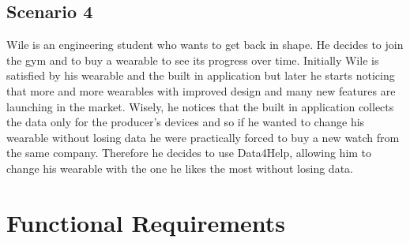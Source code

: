 \subsection{Scenario 4}
Wile is an engineering student who wants to get back in shape. He decides to join the gym and to buy a wearable to see its progress over time. Initially Wile is satisfied by his wearable and the built in application but later he starts noticing that more and more wearables with improved design and many new features are launching in the market. Wisely, he notices that the built in application collects the data only for the producer's devices and so if he wanted to change his wearable without losing data he were practically forced to buy a new watch from the same company. Therefore he decides to use Data4Help, allowing him to change his wearable with the one he likes the most without losing data.

\section{Functional Requirements}

